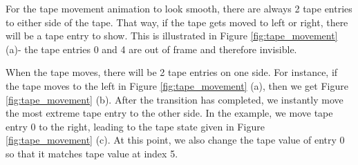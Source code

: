 For the tape movement animation to look smooth, there are always 2 tape entries to either side of the tape. That way, if the tape gets moved to left or right, there will be a tape entry to show. This is illustrated in Figure \ref{fig:tape_movement} (a)- the tape entries 0 and 4 are out of frame and therefore invisible. 

When the tape moves, there will be 2 tape entries on one side. For instance, if the tape moves to the left in Figure \ref{fig:tape_movement} (a), then we get Figure \ref{fig:tape_movement} (b). After the transition has completed, we instantly move the most extreme tape entry to the other side. In the example, we move tape entry 0 to the right, leading to the tape state given in Figure \ref{fig:tape_movement} (c). At this point, we also change the tape value of entry 0 so that it matches tape value at index 5.